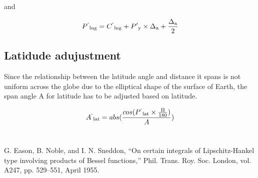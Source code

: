 \documentclass[conference]{IEEEtran}
\begin{document}
and

\begin{equation}P\textsuperscript{`}\textsubscript{lng} = C\textsuperscript{`}\textsubscript{lng} + P'\textsubscript{y} \times \Delta\textsubscript{a} + \frac{\Delta\textsubscript{a}}{2}\end{equation}

\subsection{Latidude adujustment}
Since the relationship between the latitude angle and distance it spans is not uniform across the globe due to the elliptical shape of the surface of Earth\cite{b1}, the span angle A for latitude has to be adjusted based on latitude.

\begin{equation}A\textsuperscript{`}\textsubscript{lat} = abs(\frac{cos(P\textsuperscript{`}\textsubscript{lat} \times \frac{\Pi}{180})}{A})\end{equation}
\\
\begin{thebibliography}{00}
 G. Eason, B. Noble, and I. N. Sneddon, ``On certain integrals of Lipschitz-Hankel type involving products of Bessel functions,'' Phil. Trans. Roy. Soc. London, vol. A247, pp. 529--551, April 1955.
\end{thebibliography}
\end{document}
